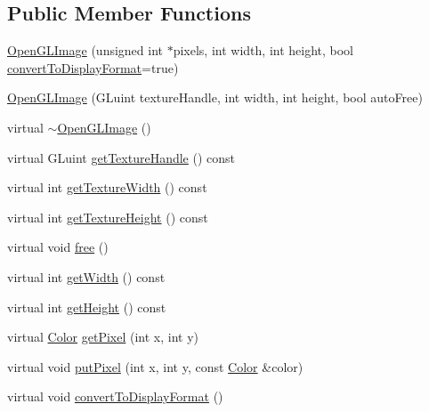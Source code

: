 \subsection*{Public Member Functions}
\begin{DoxyCompactItemize}
\item 
\hyperlink{classgcn_1_1OpenGLImage_a5ebbcbf53c4c5590b3a7a3228b19f8b9}{Open\+G\+L\+Image} (unsigned int $\ast$pixels, int width, int height, bool \hyperlink{classgcn_1_1OpenGLImage_a1f1f25745fb9a89a06db56b3e6b2748e}{convert\+To\+Display\+Format}=true)
\item 
\hyperlink{classgcn_1_1OpenGLImage_a186ea6cb7dfa9f33affdab4427bbff62}{Open\+G\+L\+Image} (G\+Luint texture\+Handle, int width, int height, bool auto\+Free)
\item 
virtual \hyperlink{classgcn_1_1OpenGLImage_a0c7ada253a255b5d489886bb9690119e}{$\sim$\+Open\+G\+L\+Image} ()
\item 
virtual G\+Luint \hyperlink{classgcn_1_1OpenGLImage_aeaba17efd232e7474df819d1a5ebd583}{get\+Texture\+Handle} () const 
\item 
virtual int \hyperlink{classgcn_1_1OpenGLImage_a1cd3019b4e7b49d45053ea7abfea98a6}{get\+Texture\+Width} () const 
\item 
virtual int \hyperlink{classgcn_1_1OpenGLImage_a24e7905f5c9887549158ffac5e53d9de}{get\+Texture\+Height} () const 
\item 
virtual void \hyperlink{classgcn_1_1OpenGLImage_a5ca72fa90e8f913bbfa37dd067e2c56a}{free} ()
\item 
virtual int \hyperlink{classgcn_1_1OpenGLImage_ad4c50cb4ecbee9dab3e2894dd650a31c}{get\+Width} () const 
\item 
virtual int \hyperlink{classgcn_1_1OpenGLImage_a88ecce91748e69434abf055404f5b306}{get\+Height} () const 
\item 
virtual \hyperlink{classgcn_1_1Color}{Color} \hyperlink{classgcn_1_1OpenGLImage_a68af180d0683001cdf1b49fd36d15cfc}{get\+Pixel} (int x, int y)
\item 
virtual void \hyperlink{classgcn_1_1OpenGLImage_a8dde453536853dbfc3ea62b21744655b}{put\+Pixel} (int x, int y, const \hyperlink{classgcn_1_1Color}{Color} \&color)
\item 
virtual void \hyperlink{classgcn_1_1OpenGLImage_a1f1f25745fb9a89a06db56b3e6b2748e}{convert\+To\+Display\+Format} ()
\end{DoxyCompactItemize}
